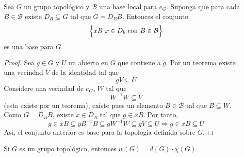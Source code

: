 \documentclass[12pt]{report}
\theoremstyle{largebreak}
\begin{document}
    \begin{theor}
        Sea $G$ un grupo topológico y $\mathcal{B}$ una base local para $e_G$. Suponga que para cada $B\in\mathcal{B}$ existe $D_B\subseteq G$ tal que $G=D_BB$. Entonces el conjunto
        \begin{equation*}
            \left\{xB\Big|x\in D_b\textup{ con }B\in\mathcal{B}\right\}
        \end{equation*}
        es una base para $G$.
    \end{theor}

    \begin{proof}
        Sea $g\in G$ y $U$ un abierto en $G$ que contiene a $g$. Por un teorema existe una vecindad $V$ de la identidad tal que
        \begin{equation*}
            gV\subseteq U
        \end{equation*}
        Considere una vecindad de $e_G$, $W$ tal que
        \begin{equation*}
            W^{-1}W\subseteq V
        \end{equation*}
        (esta existe por un teorema), existe pues un elemento $B\in\mathcal{B}$ tal que $B\subseteq W$. Como $G=D_BB$, existe $x\in D_B$ tal que $g\in xB$. Por tanto,
        \begin{equation*}
            g\in xB\subseteq gB^{-1}B\subseteq gW^{-1}W\subseteq gV\subseteq U
            \Rightarrow g\in xB\subseteq U
        \end{equation*}
        Así, el conjunto anterior es base para la topología definida sobre $G$.
    \end{proof}

    \begin{cor}
        Si $G$ es un grupo topológico, entonces $w(G)=d(G)\cdot\chi(G)$.
    \end{cor}
\end{document}
